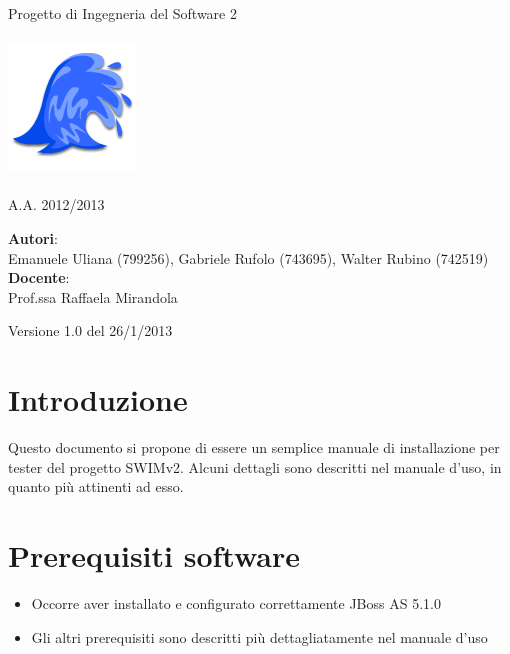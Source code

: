 \documentclass[a4paper,12pt]{article}
\begin{document}
\vspace*{\fill}
\begin{center}
{\fontsize{28}{10} \selectfont \textcolor{mygrey}{Progetto di Ingegneria del Software 2} \\[2\baselineskip]} {\fontsize{42}{10} \selectfont {\bfseries SWIMv2}} \\[4\baselineskip]
\includegraphics[scale=1]{wave-icon} \\[4\baselineskip]
{\fontsize{28}{10} \selectfont {\bfseries \textcolor{blue}{Manuale d'uso}} \\[2\baselineskip] A.A. 2012/2013}
\end{center}
\begin{flushleft}
{\fontsize{18}{10}
{\bfseries Autori}: \\ Emanuele Uliana (799256), Gabriele Rufolo (743695), Walter Rubino (742519) \\[1\baselineskip]
{\bfseries Docente}: \\ Prof.ssa Raffaela Mirandola
}
\end{flushleft}
\vspace*{\fill}
\begin{center}
Versione 1.0 del 26/1/2013 \\
\end{center}

\clearpage

	    \vspace*{\fill}
	\tableofcontents
	    \vspace*{\fill}

\clearpage

\section{Introduzione}
Questo documento si propone di essere un semplice manuale di installazione per tester del progetto SWIMv2. Alcuni dettagli sono descritti nel manuale d'uso, in quanto più attinenti
ad esso.

\section{Prerequisiti software}
\begin{itemize}
 \item Occorre aver installato e configurato correttamente JBoss AS 5.1.0
 \item Gli altri prerequisiti sono descritti più dettagliatamente nel manuale d'uso
\end{itemize}
\end{document}
